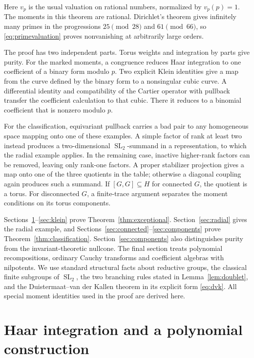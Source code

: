 \documentclass[11pt]{article}
\numberwithin{equation}{section}
\theoremstyle{definition}
\theoremstyle{remark}
\newcommand{\SL}{\operatorname{SL}}
\begin{document}
Here $v_p$ is the usual valuation on rational numbers, normalized by
$v_p(p)=1$. The moments in this theorem are rational. Dirichlet's theorem \cite[Theorem~18.1]{Sutherland}
gives infinitely many primes in the progressions $25\pmod{28}$ and
$61\pmod{66}$, so \eqref{eq:primevaluation} proves nonvanishing at
arbitrarily large orders.

The proof has two independent parts. Torus weights and integration by
parts give purity. For the marked moments, a congruence reduces Haar
integration to one coefficient of a binary form modulo $p$. Two explicit
Klein identities give a map from the curve defined by the binary form
to a nonsingular cubic curve. A differential identity and compatibility
of the Cartier operator with pullback transfer the coefficient
calculation to that cubic. There it reduces to a binomial coefficient
that is nonzero modulo $p$.

For the classification, equivariant pullback carries a bad pair to
any homogeneous space mapping onto one of these examples. A simple
factor of rank at least two instead produces a two-dimensional
$\SL_2$-summand in a representation, to which the radial example applies.
In the remaining case, inactive higher-rank factors can be removed,
leaving only rank-one factors. A proper stabilizer projection gives a
map onto one of the three quotients in the table; otherwise a diagonal
coupling again produces such a summand. If $[G,G]\subseteq H$ for
connected $G$, the quotient is a torus. For disconnected
$G$, a finite-trace argument separates the moment conditions on its
torus components.

Sections~\ref{sec:haar}--\ref{sec:klein} prove
Theorem~\ref{thm:exceptional}. Section~\ref{sec:radial} gives the radial
example, and Sections~\ref{sec:connected}--\ref{sec:components} prove
Theorem~\ref{thm:classification}. Section~\ref{sec:components} also
distinguishes purity from the invariant-theoretic nullcone. The final
section treats polynomial recompositions, ordinary Cauchy transforms
and coefficient algebras with nilpotents. We use standard structural
facts about reductive groups, the classical finite subgroups of $\SL_2$,
the two branching rules stated in Lemma~\ref{lem:doublet}, and the
Duistermaat--van der Kallen theorem in its explicit form
\eqref{eq:dvk}. All special moment identities used in the proof are
derived here.

\section{Haar integration and a polynomial construction}\label{sec:haar}
\end{document}
